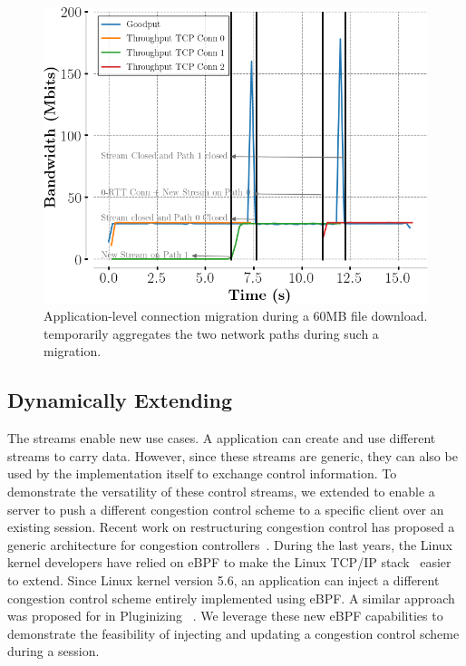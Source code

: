 \begin{figure}[!t]
  \begin{center}
    \includegraphics[width=.8\columnwidth]{figures/migration.png}
  \end{center}
\vspace{-0.5cm}
  \caption{Application-level connection migration during a 60MB file download.
    \tcpls temporarily aggregates the two network paths during such a migration.}
  \label{fig:conn_migration}
\end{figure}

\subsection{Dynamically Extending \tcpls}

The \tcpls streams enable new use cases. A \tcpls application can
create and use different streams to carry data. However, since these streams
are generic, they can also be used by the \tcpls implementation itself to
exchange control information. To demonstrate the versatility of these control
streams, we extended \tcpls to enable a server to push a different congestion
control scheme to a specific client over an existing \tcpls session. Recent
work on restructuring congestion control has proposed a generic architecture
for congestion controllers~\cite{narayan2018restructuring}.
During the last years, the Linux kernel developers have relied on eBPF
to make the Linux TCP/IP stack~\cite{brakmo2017tcp,tran2020beyond} easier
to extend. Since Linux kernel version 5.6, an application can inject
a different congestion control scheme entirely implemented using eBPF. A similar
approach was proposed for \quic in Pluginizing \quic~\cite{de2019pluginizing}. We
leverage these new eBPF capabilities to demonstrate the feasibility of injecting
and updating a congestion control scheme during a \tcpls session.


